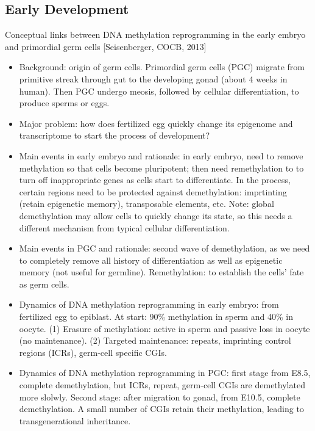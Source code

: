 \documentclass{report}
\begin{document}
\subsection{Early Development}

Conceptual links between DNA methylation reprogramming in the early embryo and primordial germ cells [Seisenberger, COCB, 2013]
\begin{itemize}
	\item Background: origin of germ cells. Primordial germ cells (PGC) migrate from primitive streak through gut to the developing gonad (about 4 weeks in human). Then PGC undergo meosis, followed by cellular differentiation, to produce sperms or eggs. 
	
	\item Major problem: how does fertilized egg quickly change its epigenome and transcriptome to start the process of development? 
	
	\item Main events in early embryo and rationale: in early embryo, need to remove methylation so that cells become pluripotent; then need remethylation to to turn off inappropriate genes as cells start to differentiate. In the process, certain regions need to be protected against demethylation: imprtinting (retain epigenetic memory), transposable elements, etc. Note: global demethylation may allow cells to quickly change its state, so this needs a different mechanism from typical cellular differentiation.  
	
	\item Main events in PGC and rationale: second wave of demethylation, as we need to completely remove all history of differentiation as well as epigenetic memory (not useful for germline). Remethylation: to establish the cells’ fate as germ cells. 
	
	\item Dynamics of DNA methylation reprogramming in early embryo: from fertilized egg to epiblast. At start: 90\% methylation in sperm and 40\% in oocyte. (1) Erasure of methylation: active in sperm and passive loss in oocyte (no maintenance). (2) Targeted maintenance: repeats, imprinting control regions (ICRs), germ-cell specific CGIs. 
	
	\item Dynamics of DNA methylation reprogramming in PGC: first stage from E8.5, complete demethylation, but ICRs, repeat, germ-cell CGIs are demethylated more slolwly. Second stage: after migration to gonad, from E10.5, complete demethylation. A small number of CGIs retain their methylation, leading to transgenerational inheritance. 
	

\end{itemize}
\end{document}
